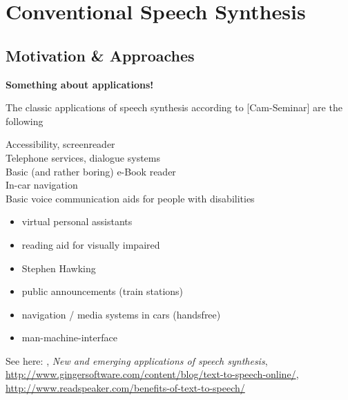 

\section{Conventional Speech Synthesis}
\label{sec:speech}

\subsection{Motivation \& Approaches}
\label{subsec:convenspeech}

\textbf{\color{ACMRed}Something about applications!}

The classic applications of speech synthesis according to [Cam-Seminar] are the following


Accessibility, screenreader\\
Telephone services, dialogue systems\\
Basic (and rather boring) e-Book reader\\
In-car navigation\\
Basic voice communication aids for people with disabilities\\


\begin{itemize}[leftmargin=10pt]
	\item virtual personal assistants
	\item reading aid for visually impaired
	\item Stephen Hawking
	\item public announcements (train stations)
	\item navigation / media systems in cars (handsfree)
	\item man-machine-interface
\end{itemize}

See here: \cite{suendermann:challenges}, \textit{New and emerging applications of speech synthesis}, \url{http://www.gingersoftware.com/content/blog/text-to-speech-online/}, \url{http://www.readspeaker.com/benefits-of-text-to-speech/}\\


